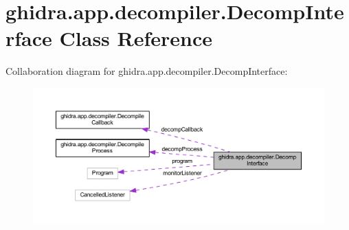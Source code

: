 \hypertarget{classghidra_1_1app_1_1decompiler_1_1_decomp_interface}{}\section{ghidra.\+app.\+decompiler.\+Decomp\+Interface Class Reference}
\label{classghidra_1_1app_1_1decompiler_1_1_decomp_interface}


Collaboration diagram for ghidra.\+app.\+decompiler.\+Decomp\+Interface\+:
\nopagebreak
\begin{figure}[H]
\begin{center}
\leavevmode
\includegraphics[width=350pt]{classghidra_1_1app_1_1decompiler_1_1_decomp_interface__coll__graph}
\end{center}
\end{figure}
